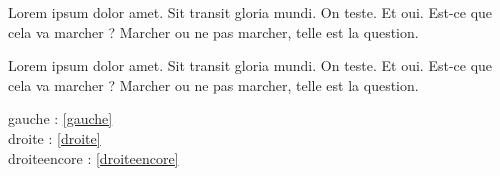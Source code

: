 \documentclass[twoside]{book}
\begin{document}
\begin{pairs}
\begin{Leftside}
\beginnumbering
\pstart
Lorem ipsum dolor amet. Sit transit gloria mundi.
On teste. Et oui. Est-ce que cela va marcher ? Marcher ou ne pas marcher, telle est la question.
\pend
\endnumbering
\end{Leftside}

\begin{Rightside}
\beginnumbering
\pstart
Lorem ipsum dolor amet. Sit transit gloria mundi.
On teste. Et oui. Est-ce que cela va marcher ? Marcher ou ne pas marcher, telle est la question.
\pend
\endnumbering
\end{Rightside}
\end{pairs}

\Columns

gauche : \ref{gauche}\\
droite : \ref{droite}\\
droiteencore : \ref{droiteencore}
\end{document}
